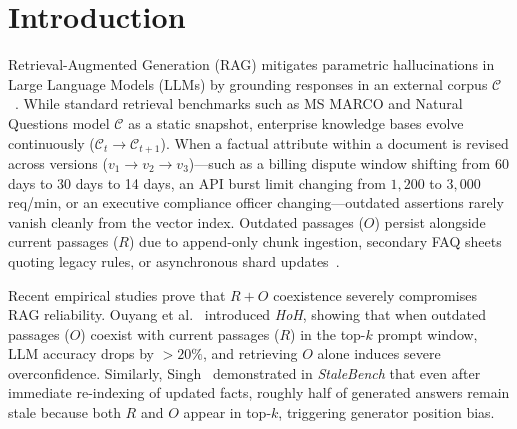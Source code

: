 \documentclass[11pt,a4paper]{article}
\theoremstyle{definition}
\begin{document}
\section{Introduction}
Retrieval-Augmented Generation (RAG) mitigates parametric hallucinations in Large Language Models (LLMs) by grounding responses in an external corpus $\mathcal{C}$~\cite{lewis2020rag}. While standard retrieval benchmarks such as MS MARCO and Natural Questions model $\mathcal{C}$ as a static snapshot, enterprise knowledge bases evolve continuously ($\mathcal{C}_t \to \mathcal{C}_{t+1}$). When a factual attribute within a document is revised across versions ($v_1 \to v_2 \to v_3$)---such as a billing dispute window shifting from 60 days to 30 days to 14 days, an API burst limit changing from $1{,}200$ to $3{,}000$ req/min, or an executive compliance officer changing---outdated assertions rarely vanish cleanly from the vector index. Outdated passages ($O$) persist alongside current passages ($R$) due to append-only chunk ingestion, secondary FAQ sheets quoting legacy rules, or asynchronous shard updates~\cite{tantaroudas2026after}.

Recent empirical studies prove that $R+O$ coexistence severely compromises RAG reliability. Ouyang et al.~\cite{ouyang2025hoh} introduced \emph{HoH}, showing that when outdated passages ($O$) coexist with current passages ($R$) in the top-$k$ prompt window, LLM accuracy drops by $>20\%$, and retrieving $O$ alone induces severe overconfidence. Similarly, Singh~\cite{singh2026stalebench} demonstrated in \emph{StaleBench} that even after immediate re-indexing of updated facts, roughly half of generated answers remain stale because both $R$ and $O$ appear in top-$k$, triggering generator position bias.
\end{document}
